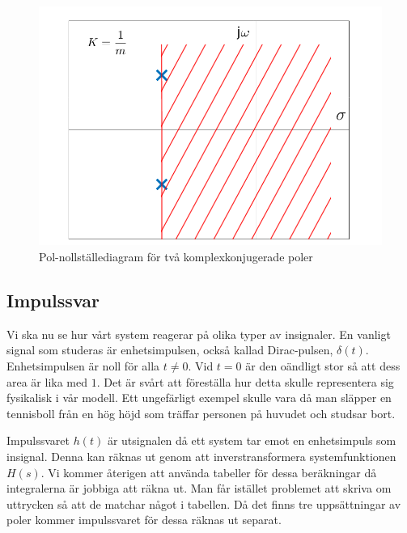 \begin{figure}[H] 
    \centering
    \includegraphics[scale=0.33]{bilder/pol_nollstallediagram_komplexa_poler}
    \caption{Pol-nollställediagram för två komplexkonjugerade poler}
    \label{fig:pol_nollstallediagram_komplexa_poler}
\end{figure}
 
\newpage
\subsection{Impulssvar}
Vi ska nu se hur vårt system reagerar på olika typer av insignaler. En vanligt signal som studeras är enhetsimpulsen, också kallad Dirac-pulsen, $\delta(t)$. 
Enhetsimpulsen är noll för alla $t\ne 0$. Vid $t = 0$ är den oändligt stor så att dess area är lika med $1$. Det är svårt att föreställa hur detta skulle representera sig fysikalisk i vår modell. Ett ungefärligt exempel skulle vara då man släpper en tennisboll från en hög höjd som träffar personen på huvudet och studsar bort. 

Impulssvaret $h(t)$ är utsignalen då ett system tar emot en enhetsimpuls som insignal. Denna kan räknas ut genom att inverstransformera systemfunktionen $H(s)$. Vi kommer återigen att använda tabeller för dessa beräkningar då integralerna är jobbiga att räkna ut. Man får istället problemet att skriva om uttrycken så att de matchar något i tabellen. Då det finns tre uppsättningar av poler kommer impulssvaret för dessa räknas ut separat.

